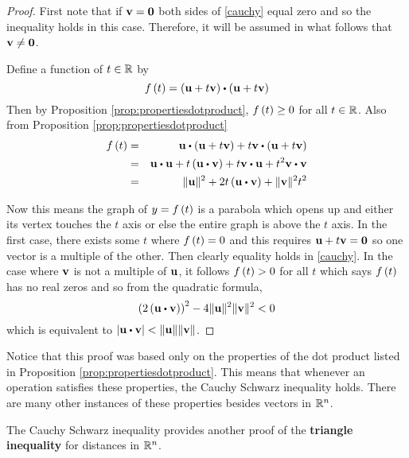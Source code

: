 \begin{proof}
First note that if ${\bf v}={\bf 0}$ both sides of \ref{cauchy}
equal zero and so the inequality holds in this case. Therefore, it will be
assumed in what follows that ${\bf v}\neq {\bf 0}$.

Define a function of $t\in \mathbb{R}$ by 
\begin{equation*}
f\tup{t} =\tup{\vect{u}+t\vect{v}} \dotprod \tup{\vect{u}+
t\vect{v}} 
\end{equation*}
Then by Proposition \ref{prop:propertiesdotproduct}, $f\left(t\right) \geq 0$ for all $t\in \mathbb{R}$.
Also from Proposition \ref{prop:propertiesdotproduct}
\begin{eqnarray*}
f\tup{t} &=&\vect{u}\dotprod \tup{\vect{u}+t\vect{v}} +
t\vect{v}\dotprod \tup{\vect{u}+t\vect{v}} \\
&=&\vect{u}\dotprod \vect{u}+t\tup{\vect{u}\dotprod \vect{v}} + t \vect{v}\dotprod \vect{u}+
t^{2}\vect{v}\dotprod \vect{v} \\
&=&\norm{\vect{u}} ^{2}+2t\tup{\vect{u}\dotprod \vect{v}} +\norm{
\vect{v}} ^{2}t^{2}
\end{eqnarray*}

Now this means the graph of $y=f\left(t\right) $ is a parabola which opens
up and either its vertex touches the $t$ axis or else the entire graph is
above the $t$ axis. In the first case, there exists some $t$ where $f\left(
t\right) =0$ and this requires ${\bf u}+t{\bf v}={\bf 0}$ so one vector is a
multiple of the other. Then clearly equality holds in \ref{cauchy}. In the
case where ${\bf v}$ is not a multiple of ${\bf u}$, it follows 
$f\left(t\right) >0$ for all $t$ which says $f\left(t\right) $ has no real
zeros and so from the quadratic formula,
\begin{equation*}
\tup{2\tup{\vect{u}\dotprod \vect{v}} } ^{2}-4\norm{\vect{u}
} ^{2}\norm{\vect{v}} ^{2}<0
\end{equation*}
which is equivalent to $\abs{\vect{u}\dotprod \vect{v} }<\norm{\vect{u}} \norm{\vect{v}} $.
\end{proof}

Notice that this proof was based only on the properties of
the dot product listed in Proposition \ref{prop:propertiesdotproduct}. This means that
whenever an operation satisfies these properties, the Cauchy Schwarz inequality
holds. There are many other instances of these properties besides vectors in
$\mathbb{R}^{n}$.

The Cauchy Schwarz inequality provides another proof of the \textbf{triangle
inequality} for
distances in $\mathbb{R}^{n}$.

